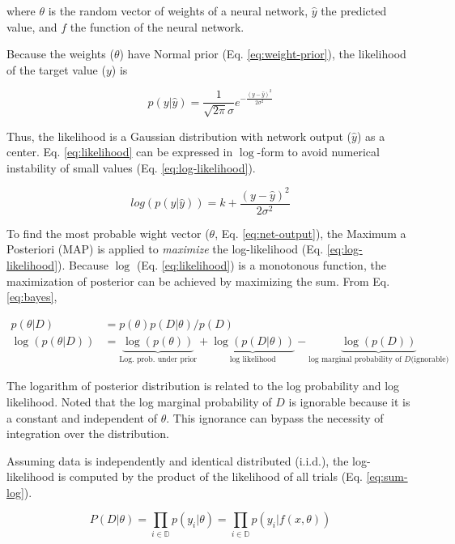 \documentclass{article}
\begin{document}
where $\theta$ is the random vector of weights of a neural network, $\hat{y}$ the predicted value, and $f$ the function of the neural network.

Because the weights ($\theta$) have Normal prior (Eq. \ref{eq:weight-prior}),  the likelihood of the target value ($y$) is 

\begin{equation}
    p(y|\hat{y}) = \frac{1}{\sqrt{2\pi}\sigma}e^{-\frac{(y-\hat{y})^2}{2\sigma^2}}
    \label{eq:likelihood}
\end{equation}

Thus, the likelihood is a Gaussian distribution with network output ($\hat{y}$) as a center. Eq. \ref{eq:likelihood} can be expressed in $\log$-form to avoid numerical instability of small values (Eq. \ref{eq:log-likelihood}).

\begin{equation}
    log (p(y|\hat{y})) = k + \frac{(y-\hat{y})^2}{2\sigma^2}
    \label{eq:log-likelihood}
\end{equation}


To find the most probable wight vector ($\theta$, Eq. \ref{eq:net-output}), the Maximum a Posteriori (MAP) is applied to \textit{maximize} the log-likelihood (Eq. \ref{eq:log-likelihood}). Because $\log$ (Eq. \ref{eq:likelihood}) is a monotonous function, the maximization of posterior can be achieved by maximizing the sum. From Eq. \ref{eq:bayes}, 

\begin{align}
    p(\theta|D) &= p(\theta) p(D|\theta) / p(D)\\
    \log(p(\theta|D)) &= \underbrace{\log(p(\theta))}_{\text{Log. prob. under prior}} + \underbrace{\log(p(D|\theta))}_{\text{log likelihood}} - \underbrace{\log(p(D))}_{\text{log marginal probability of } D \text{(ignorable)}}\label{eq:log-sums}
\end{align}

The logarithm of posterior distribution is related to the log probability and log likelihood. Noted that the log marginal probability of $D$ is ignorable because it is a constant and independent of $\theta$. This ignorance can bypass the necessity of integration over the distribution.


Assuming data is independently and identical distributed (i.i.d.), the log-likelihood is computed by the product of the likelihood of all trials (Eq. \ref{eq:sum-log}).

\begin{equation}
    P(D|\theta) = \prod_{i\in \mathbb{D}} p(y_i | \theta) = \prod_{i \in \mathbb{D}} p(y_i | f(x, \theta))
\label{eq:sum-log}
\end{equation}
\end{document}
